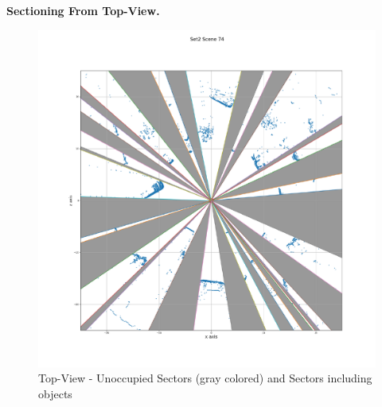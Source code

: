\textbf{Sectioning From Top-View.} 

\begin{figure}[!ht]
\begin{center}
  \includegraphics[scale=0.5]{./images/sector-with-bg/74.pdf}
  \caption{Top-View - Unoccupied Sectors (gray colored) and  Sectors including objects}
  \label{fig:sectors}
\end{center}
\end{figure}








